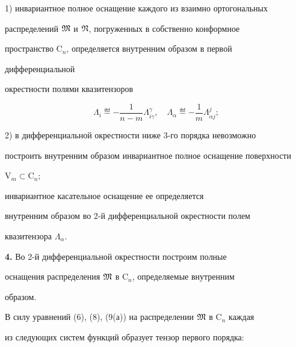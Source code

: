  


1) инвариантное полное оснащение каждого из взаимно ортогональных 


распределений $\frak M$ и $\frak N$, погруженных в собственно конформное 


пространство $\mathrm C_n$, определяется внутренним образом в первой 


дифференциальной 


окрестности полями квазитензоров 


\begin{equation} 


\Lambda_i \eqdef-\frac{1}{n-m}\Lambda^\gamma_{i\gamma},\quad 


\Lambda_\alpha\eqdef-\frac{1}{m}\Lambda^j_{\alpha j}; 


\end{equation} 


 


2) в дифференциальной окрестности ниже 3-го порядка невозможно 


построить внутренним образом инвариантное полное оснащение поверхности 


$\mathrm V_m\subset\mathrm C_n$; 


инвариантное касательное оснащение ее определяется 


внутренним образом во 2-й дифференциальной окрестности полем 


квазитензора $\Lambda_\alpha$. 


\medskip 


 


{\bf 4.} Во 2-й дифференциальной окрестности построим полные 


оснащения распределения $\frak M$ в $\mathrm C_n$, определяемые внутренним 


образом. 


 


В силу уравнений (6), (8), (9(а)) на распределении $\frak M$ в $\mathrm 


C_n$ каждая 


из следующих систем функций образует тензор первого порядка: 



